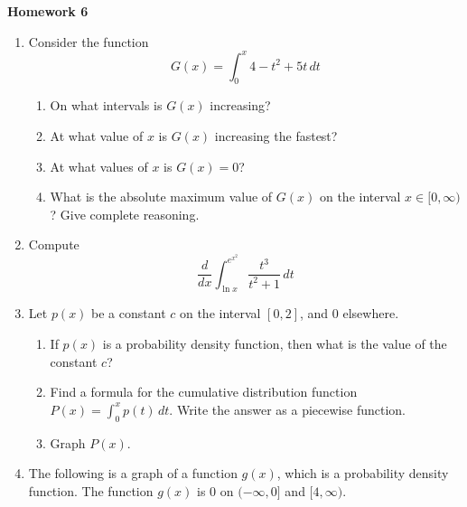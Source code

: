 \documentclass{article}
\begin{document}
\begin{center}
    \large \textbf{Homework 6}
\end{center}
                \begin{enumerate}
                    \item Consider the function
                    $$G(x) = \int_0^x 4-t^2+5t\,dt$$
                    \begin{enumerate}
                        \item On what intervals is $G(x)$ increasing?
                        \item At what value of $x$ is $G(x)$ increasing the fastest?
                        \item At what values of $x$ is $G(x)=0$?
                        \item What is the absolute maximum value of $G(x)$ on the interval $x \in [0,\infty)$? Give complete reasoning.
                    \end{enumerate}
                    \item Compute
                    $$\frac{d}{dx} \int_{\ln{x}}^{e^{x^2}} \frac{t^3}{t^2+1}\,dt$$
                    \item Let $p(x)$ be a constant $c$ on the interval $[0,2]$, and $0$ elsewhere.
                    \begin{enumerate}
                        \item If $p(x)$ is a probability density function, then what is the value of the constant $c$?
                        \item Find a formula for the cumulative distribution function $ P(x)=\int_0^x p(t)\,dt$. Write the answer as a piecewise function. 
                        \item Graph $P(x)$.
                        
                    \end{enumerate}
                \item The following is a graph of a function $g(x)$, which is a probability density function. The function $g(x)$ is $0$ on $(-\infty,0]$ and $[4,\infty)$.
                        \begin{center}
\end{center}
\end{enumerate}
\end{document}
